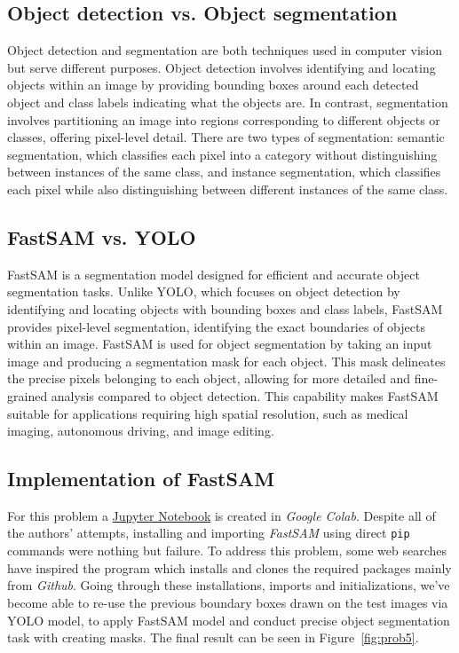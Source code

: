 \documentclass[conference]{IEEEtran}
\let\oldtexttt\texttt
\renewcommand{\texttt}[1]{\small\oldtexttt{#1}}
\begin{document}
\subsection{Object detection vs. Object segmentation}
Object detection and segmentation are both techniques used in computer vision but serve different purposes. Object detection involves identifying and locating objects within an image by providing bounding boxes around each detected object and class labels indicating what the objects are. In contrast, segmentation involves partitioning an image into regions corresponding to different objects or classes, offering pixel-level detail. There are two types of segmentation: semantic segmentation, which classifies each pixel into a category without distinguishing between instances of the same class, and instance segmentation, which classifies each pixel while also distinguishing between different instances of the same class.

\subsection{FastSAM vs. YOLO}
FastSAM is a segmentation model designed for efficient and accurate object segmentation tasks. Unlike YOLO, which focuses on object detection by identifying and locating objects with bounding boxes and class labels, FastSAM provides pixel-level segmentation, identifying the exact boundaries of objects within an image.
FastSAM is used for object segmentation by taking an input image and producing a segmentation mask for each object. This mask delineates the precise pixels belonging to each object, allowing for more detailed and fine-grained analysis compared to object detection. This capability makes FastSAM suitable for applications requiring high spatial resolution, such as medical imaging, autonomous driving, and image editing.

\subsection{Implementation of FastSAM}
For this problem a \href{https://colab.research.google.com/drive/1I6auu-cPE4nA_uiOiNw0u5TZJ6KCrFXq#scrollTo=tIgKnKD8Cv51}{Jupyter Notebook} is created in \textit{Google Colab}. Despite all of the authors' attempts, installing and importing \textit{FastSAM} using direct \texttt{pip} commands were nothing but failure. To address this problem, some web searches \cite{b5} have inspired the program which installs and clones the required packages mainly from \textit{Github}. Going through these installations, imports and initializations, we've become able to re-use the previous boundary boxes drawn on the test images via YOLO model, to apply FastSAM model and conduct precise object segmentation task with creating masks. The final result can be seen in Figure~\ref{fig:prob5}.
\end{document}
